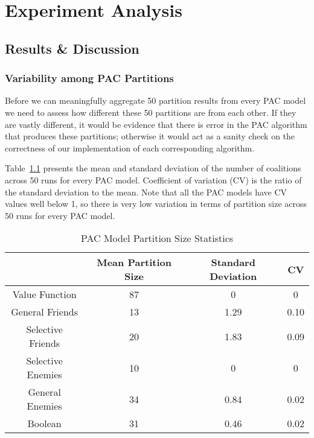 
\chapter{Experiment Analysis}
\label{ch:analysis}
\vspace{2em}

\section{Results \& Discussion}
\label{sec:results_and_discussion}

\subsection{Variability among PAC Partitions}
\label{subsec:variability_among_pac_partitions}

Before we can meaningfully aggregate 50 partition results from every PAC model
we need to assess how different these 50 partitions are from each other.
If they are vastly different, it would be evidence that there is error in the
PAC algorithm that produces these partitions; otherwise it would act as a sanity
check on the correctness of our implementation of each corresponding algorithm.

Table~\ref{Analysis:table:pac_num_coalitions} presents the mean and standard
deviation of the number of coalitions across 50 runs for every PAC model.
Coefficient of variation (CV) is the ratio of the standard deviation to the mean.
Note that all the PAC models have CV values well below 1, so there is very low
variation in terms of partition size across 50 runs for every PAC model.

\begin{table}[h!]
\centering
\begin{tabular}{|c|c|c|c|}
\hline
       & Mean Partition Size & Standard Deviation & CV \\ \hline
Value Function & 87 & 0 & 0 \\
General Friends & 13 & 1.29 & 0.10  \\
Selective Friends & 20 & 1.83 & 0.09  \\
Selective Enemies & 10 & 0 & 0 \\
General Enemies & 34 & 0.84 & 0.02 \\
Boolean & 31 & 0.46 & 0.02  \\
\hline
\end{tabular}
\caption{PAC Model Partition Size Statistics}
\label{Analysis:table:pac_num_coalitions}
\end{table}

